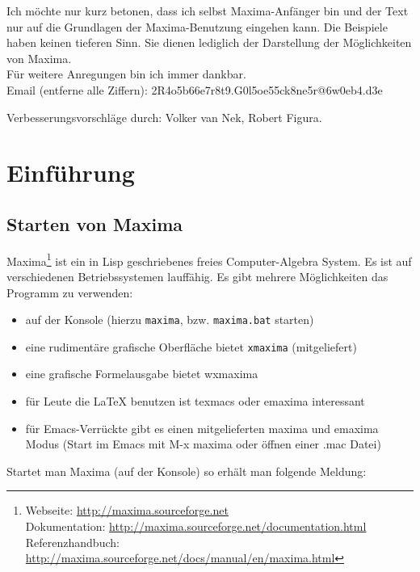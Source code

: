 \documentclass[12pt]{scrartcl}
\begin{document}
\vspace{1cm}

Ich möchte nur kurz betonen, dass ich selbst Maxima-Anfänger bin und der Text nur auf die Grundlagen der Maxima-Benutzung eingehen kann. Die Beispiele haben keinen tieferen Sinn. Sie dienen lediglich der Darstellung der Möglichkeiten von Maxima.\\
Für weitere Anregungen bin ich immer dankbar\@.\\
Email (entferne alle Ziffern): 2R4o5b66e7r8t9.G0l5oe55ck8ne5r@6w0eb4.d3e

\vspace{1cm}
Verbesserungsvorschläge durch: Volker van Nek, Robert Figura.

\newpage
\section{Einführung}

\subsection{Starten von Maxima}

Maxima\footnote
{Webseite: \url{http://maxima.sourceforge.net} \\
Dokumentation: \url{http://maxima.sourceforge.net/documentation.html} \\
Referenzhandbuch: \url{http://maxima.sourceforge.net/docs/manual/en/maxima.html}}
ist ein in Lisp geschriebenes freies Computer-Algebra System. Es ist
auf verschiedenen Betriebssystemen lauffähig.
Es gibt mehrere Möglichkeiten das Programm zu verwenden:

\begin{itemize}
\item auf der Konsole (hierzu \texttt{maxima}, bzw. \texttt{maxima.bat} starten)
\item eine rudimentäre grafische Oberfläche bietet \texttt{xmaxima} (mitgeliefert)
\item eine grafische Formelausgabe bietet wxmaxima
\item für Leute die \LaTeX{} benutzen ist texmacs oder emaxima interessant
\item für Emacs-Verrückte gibt es einen mitgelieferten maxima und
  emaxima Modus (Start im Emacs mit M-x maxima oder öffnen einer {.mac} Datei)
\end{itemize}

Startet man Maxima (auf der Konsole) so erhält man folgende Meldung:
\end{document}
